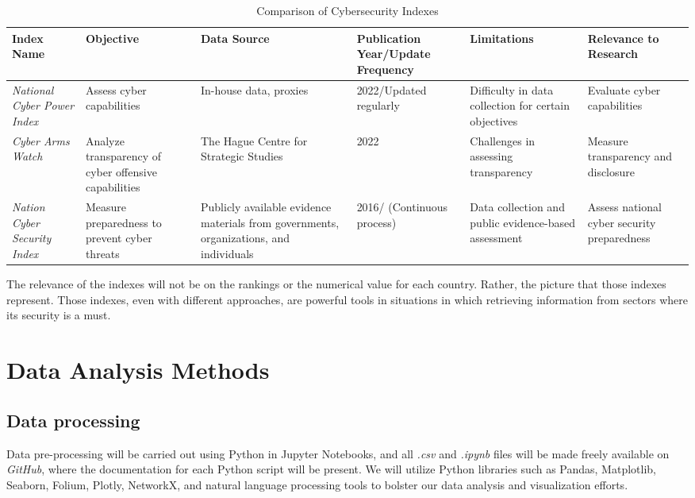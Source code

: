 \begin{table}[htbp]
  \centering
  \caption{Comparison of Cybersecurity Indexes}
  \begin{tabular}{p{1.2cm}p{2.5cm}p{2.5cm}p{2.2cm}p{2.2cm}p{3cm}}
    \toprule
    \textbf{Index Name} &
    \textbf{Objective} &
    \textbf{Data Source} &
    \textbf{Publication Year/Update Frequency} &
    \textbf{Limitations} &
    \textbf{Relevance to Research} \\
    \midrule
    \textit{National Cyber Power Index} &
    Assess cyber capabilities &
    In-house data, proxies &
    2022/Updated regularly &
    Difficulty in data collection for certain objectives &
    Evaluate cyber capabilities \\
    \midrule
    \textit{Cyber Arms Watch} &
    Analyze transparency of cyber offensive capabilities &
    The Hague Centre for Strategic Studies &
    2022 &
    Challenges in assessing transparency &
    Measure transparency and disclosure \\
    \midrule
    \textit{Nation Cyber Security Index}&
    Measure preparedness to prevent cyber threats &
    Publicly available evidence materials from governments, organizations, and individuals &
    2016/ (Continuous process) &
    Data collection and public evidence-based assessment &
    Assess national cyber security preparedness \\
    \bottomrule
  \end{tabular}
\end{table}


The relevance of the indexes will not be on the rankings or the numerical value for each country. Rather, the picture that those indexes represent. Those indexes, even with different approaches, are powerful tools in situations in which retrieving information from sectors where its security is a must. 

\section{Data Analysis Methods}
\subsection{Data processing}

Data pre-processing will be carried out using Python in Jupyter Notebooks, and all \textit{.csv} and \textit{.ipynb} files will be made freely available on \textit{GitHub}, where the documentation for each Python script will be present. We will utilize Python libraries such as Pandas, Matplotlib, Seaborn, Folium, Plotly, NetworkX, and natural language processing tools to bolster our data analysis and visualization efforts.

